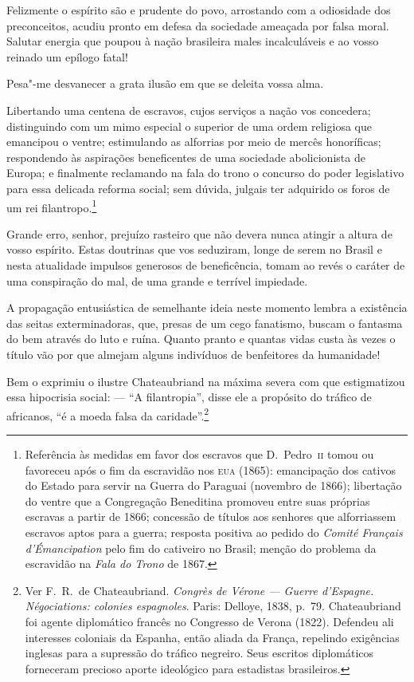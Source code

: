 Felizmente o espírito são e prudente do povo, arrostando com a
odiosidade dos preconceitos, acudiu pronto em defesa da sociedade
ameaçada por falsa moral. Salutar energia que poupou à nação brasileira
males incalculáveis e ao vosso reinado um epílogo fatal! 

Pesa"-me desvanecer a grata ilusão em que se deleita vossa alma. 

Libertando uma centena de escravos, cujos serviços a nação vos
concedera; distinguindo com um mimo especial o superior de uma ordem
religiosa que emancipou o ventre; estimulando as alforrias por meio de
mercês honoríficas; respondendo às aspirações beneficentes de uma 
sociedade abolicionista de Europa; e finalmente reclamando na fala do
trono o concurso do poder legislativo para essa delicada reforma
social; sem dúvida, julgais ter adquirido os foros de um rei
filantropo.\footnote{ Referência às medidas em favor dos escravos que D.~Pedro~\textsc{ii} 
tomou ou favoreceu após o fim da escravidão nos \textsc{eua} (1865): emancipação dos cativos 
do Estado para servir na Guerra do Paraguai (novembro de 1866); libertação do ventre que a 
Congregação Beneditina promoveu entre suas próprias escravas a partir de 1866; concessão de 
títulos aos senhores que alforriassem escravos aptos para a guerra; resposta positiva ao 
pedido do \textit{Comité Français d'Émancipation} pelo fim do cativeiro no Brasil; 
menção do problema da escravidão na \textit{Fala do Trono} de 1867.} 
 
Grande erro, senhor, prejuízo rasteiro que não devera nunca atingir a 
altura de vosso espírito. Estas doutrinas que vos seduziram, longe de
serem no Brasil e nesta atualidade impulsos generosos de beneficência,
tomam ao revés o caráter de uma conspiração do mal, de uma grande e
terrível impiedade.

A propagação entusiástica de semelhante ideia neste momento lembra a
existência das seitas exterminadoras, que, presas de um cego fanatismo,
buscam o fantasma do bem através do luto e ruína. Quanto pranto e
quantas vidas custa às vezes o título vão por que almejam alguns
indivíduos de benfeitores da humanidade!

Bem o exprimiu o ilustre Chateaubriand na máxima severa com que
estigmatizou essa hipocrisia social: --- ``A filantropia'', disse ele a
propósito do tráfico de africanos, ``é a moeda falsa da
caridade''.\footnote{ Ver F.~R.~de Chateaubriand. \textit{Congrès de Vérone --- 
Guerre d'Espagne. Négociations: colonies espagnoles}. Paris: Delloye, 1838, p.~79. 
Chateaubriand foi agente diplomático francês no Congresso 
de Verona (1822). Defendeu ali interesses coloniais da Espanha, então aliada da França, 
repelindo exigências inglesas para a supressão do tráfico negreiro. Seus escritos 
diplomáticos forneceram precioso aporte ideológico para estadistas brasileiros.}

